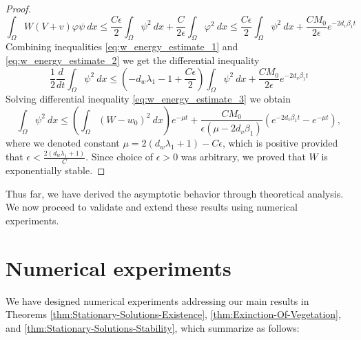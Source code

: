 \documentclass[review,onefignum,onetabnum]{SIAM-styles/siamart171218}
\begin{document}
\begin{proof}
    \begin{equation}
        \label{eq:w_energy_estimate_2}
        \int_\Omega W(V+v) \varphi \psi \:dx
        \leq
        \frac{C \epsilon}{2}\int_\Omega \psi^2 \:dx + \frac{C}{2 \epsilon} \int_\Omega \varphi^2 \:dx 
        \leq
        \frac{C \epsilon}{2}\int_\Omega \psi^2 \:dx + \frac{C M_0}{2 \epsilon} e^{-2d_v\beta_1 t}
    \end{equation}
    Combining inequalities \eqref{eq:w_energy_estimate_1} and \eqref{eq:w_energy_estimate_2} we get the differential inequality
    \begin{equation}
        \label{eq:w_energy_estimate_3}
        \frac{1}{2}\frac{d}{dt}\int_\Omega \psi^2 \:dx
        \leq
        \left( -d_w \lambda_1 - 1 + \frac{C\epsilon}{2} \right) \int_\Omega \psi^2\:dx + \frac{C M_0}{2\epsilon} e^{-2d_v \beta_1 t}
    \end{equation}
    Solving differential inequality \eqref{eq:w_energy_estimate_3} we obtain
    \begin{equation}
        \label{eq:w_energy_estimate_4}
        \int_\Omega \psi^2 \:dx \leq \left( \int_\Omega (W-w_0)^2 \:dx \right) e^{-\mu t} + \frac{C M_0}{\epsilon (\mu - 2d_v \beta_1)} \left( e^{-2d_v \beta_1 t} - e^{-\mu t} \right),
    \end{equation}
    where we denoted constant $\mu = 2(d_w\lambda_1 + 1) - C\epsilon$, which is positive provided that $\epsilon < \frac{2(d_w \lambda_1 + 1)}{C}$. Since choice of $\epsilon > 0$ was arbitrary, we proved that $W$ is exponentially stable.
\end{proof}

Thus far, we have derived the asymptotic behavior through theoretical analysis. We now proceed to validate and extend these results using numerical experiments.

\section{Numerical experiments}
We have designed numerical experiments addressing our main results in Theorems \ref{thm:Stationary-Solutions-Existence}, \ref{thm:Exinction-Of-Vegetation}, and \ref{thm:Stationary-Solutions-Stability}, which summarize as follows: 
\end{document}
